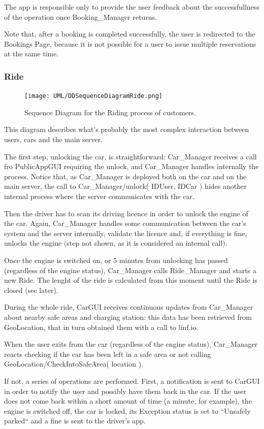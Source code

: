 \documentclass[11pt]{article} %
\begin{document}
The app is responsible only to provide the user feedback about the successfullness of the operation once Booking\_Manager returns.

Note that, after a booking is completed successfully, the user is redirected to the Bookings Page, because it is not possible for a user to issue multiple reservations at the same time.


\subsubsection{Ride}
\begin{figure}[H]
	\centering
	\texttt{[image: UML/DDSequenceDiagramRide.png]}
	\caption{Sequence Diagram for the Riding process of customers.}
\end{figure}

This diagram describes what's probably the most complex interaction between users, cars and the main server.

The first step, unlocking the car, is straightforward: Car\_Manager receives a call fro PublicAppGUI requiring the unlock, and Car\_Manager handles internally the process. Notice that, as Car\_Manager is deployed both on the car and on the main server, the call to Car\_Manager/unlock( IDUser, IDCar ) hides another internal process where the server communicates with the car.

Then the driver has to scan its driving licence in order to unlock the engine of the car. Again, Car\_Manager handles some communication between the car's system and the server internally, validate the licence and, if everything is fine, unlocks the engine (step not shown, as it is considered an internal call).

Once the engine is switched on, or 5 minutes from unlocking has passed (regardless of the engine status), Car\_Manager calls Ride\_Manager and starts a new Ride. The lenght of the ride is calculated from this moment until the Ride is closed (see later).

During the whole ride, CarGUI receives continuous updates from Car\_Manager about nearby safe areas and charging station: this data has been retrieved from GeoLocation, that in turn obtained them with a call to linf.io.

When the user exits from the car (regardless of the engine status), Car\_Manager reacts checking if the car has been left in a safe area or not calling GeoLocation/CheckIntoSafeArea( location ).

If not, a series of operations are performed. First, a notification is sent to CarGUI in order to notify the user and possibly have them back in the car. If the user does not come back within a short amount of time (a minute, for example), the engine is switched off, the car is locked, its Exception status is set to ``Unsafely parked`` and a fine is sent to the driver's app.
\end{document}
